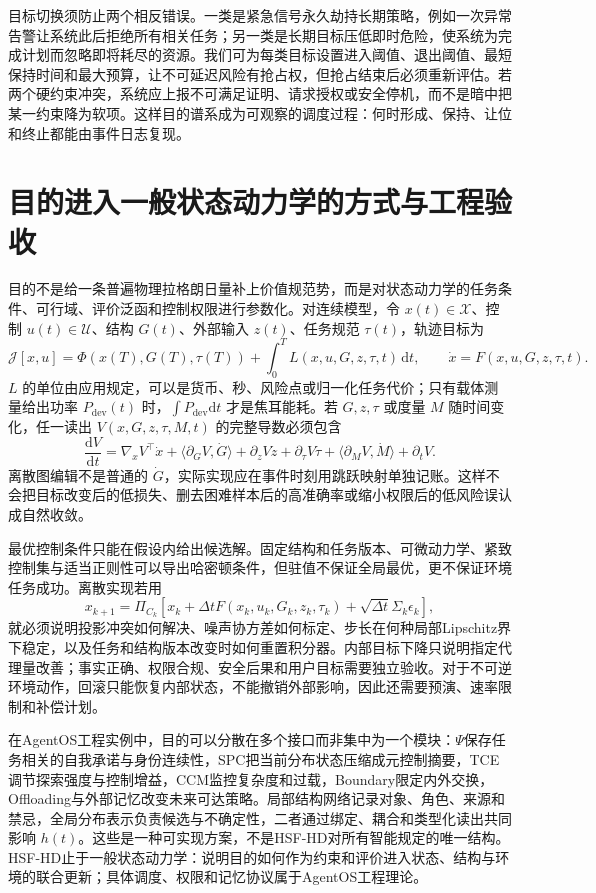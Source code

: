 目标切换须防止两个相反错误。一类是紧急信号永久劫持长期策略，例如一次异常告警让系统此后拒绝所有相关任务；另一类是长期目标压低即时危险，使系统为完成计划而忽略即将耗尽的资源。我们可为每类目标设置进入阈值、退出阈值、最短保持时间和最大预算，让不可延迟风险有抢占权，但抢占结束后必须重新评估。若两个硬约束冲突，系统应上报不可满足证明、请求授权或安全停机，而不是暗中把某一约束降为软项。这样目的谱系成为可观察的调度过程：何时形成、保持、让位和终止都能由事件日志复现。

\section{目的进入一般状态动力学的方式与工程验收}
\label{sec:section_1520}

目的不是给一条普遍物理拉格朗日量补上价值规范势，而是对状态动力学的任务条件、可行域、评价泛函和控制权限进行参数化。对连续模型，令 $x(t)\in\mathcal X$、控制 $u(t)\in\mathcal U$、结构 $G(t)$、外部输入 $z(t)$、任务规范 $\tau(t)$，轨迹目标为
\[
\mathcal J[x,u]=\Phi(x(T),G(T),\tau(T))+\int_0^TL(x,u,G,z,\tau,t)\,\mathrm dt,
\qquad \dot{x}=F(x,u,G,z,\tau,t).
\]
$L$ 的单位由应用规定，可以是货币、秒、风险点或归一化任务代价；只有载体测量给出功率 $P_{\mathrm{dev}}(t)$ 时，$\int P_{\mathrm{dev}}\mathrm dt$ 才是焦耳能耗。若 $G,z,\tau$ 或度量 $M$ 随时间变化，任一读出 $V(x,G,z,\tau,M,t)$ 的完整导数必须包含
\[
\frac{\mathrm dV}{\mathrm dt}=\nabla_xV^{\top}\dot{x}+\langle\partial_GV,\dot{G}\rangle+
\partial_zV\dot z+\partial_\tau V\dot\tau+\langle\partial_MV,\dot M\rangle+\partial_tV.
\]
离散图编辑不是普通的 $\dot G$，实际实现应在事件时刻用跳跃映射单独记账。这样不会把目标改变后的低损失、删去困难样本后的高准确率或缩小权限后的低风险误认成自然收敛。

最优控制条件只能在假设内给出候选解。固定结构和任务版本、可微动力学、紧致控制集与适当正则性可以导出哈密顿条件，但驻值不保证全局最优，更不保证环境任务成功。离散实现若用
\[
x_{k+1}=\Pi_{C_k}\left[x_k+\Delta tF(x_k,u_k,G_k,z_k,\tau_k)+\sqrt{\Delta t}\Sigma_k\epsilon_k\right],
\]
就必须说明投影冲突如何解决、噪声协方差如何标定、步长在何种局部Lipschitz界下稳定，以及任务和结构版本改变时如何重置积分器。内部目标下降只说明指定代理量改善；事实正确、权限合规、安全后果和用户目标需要独立验收。对于不可逆环境动作，回滚只能恢复内部状态，不能撤销外部影响，因此还需要预演、速率限制和补偿计划。

在AgentOS工程实例中，目的可以分散在多个接口而非集中为一个模块：$\Psi$保存任务相关的自我承诺与身份连续性，SPC把当前分布状态压缩成元控制摘要，TCE调节探索强度与控制增益，CCM监控复杂度和过载，Boundary限定内外交换，Offloading与外部记忆改变未来可达策略。局部结构网络记录对象、角色、来源和禁忌，全局分布表示负责候选与不确定性，二者通过绑定、耦合和类型化读出共同影响 $h(t)$。这些是一种可实现方案，不是HSF-HD对所有智能规定的唯一结构。HSF-HD止于一般状态动力学：说明目的如何作为约束和评价进入状态、结构与环境的联合更新；具体调度、权限和记忆协议属于AgentOS工程理论。

